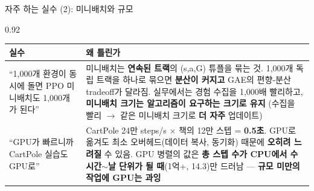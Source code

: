 \begin{frame}{자주 하는 실수 (2): 미니배치와 규모}
\begin{center}\begin{varwidth}{0.92\textwidth}
  \small
  \begin{tabular}{@{}p{4.6cm}p{9.4cm}@{}}
    \toprule
    실수 & 왜 틀린가 \\
    \midrule
    ``1,000개 환경이 동시에 돌면 PPO 미니배치도 1,000개가
      된다'' & 미니배치는 \textbf{연속된 트랙}의 (s,a,G) 튜플을
      묶는 것. 1,000개 독립 트랙을 하나로 묶으면 \textbf{분산이
      커지고} GAE의 편향-분산 tradeoff가 달라짐. 실무에서는
      경험 수집을 1,000배 빨리하고, \textbf{미니배치 크기는
      알고리즘이 요구하는 크기로 유지} (수집을 빨리 $\to$
      같은 미니배치 크기로 \textbf{더 자주} 업데이트) \\
    ``GPU가 빠르니까 CartPole 실습도 GPU로'' & CartPole 24만
      steps/s $\times$ 책의 12만 스텝 = \textbf{0.5초}. GPU로
      옮겨도 최소 오버헤드(데이터 복사, 동기화) 때문에 \textbf{오히려
      느려질} 수 있음. GPU 병렬의 값은 \textbf{총 스텝 수가 CPU에서
      수 시간$\sim$날 단위가 될 때}(1억+, 14.3)만 드러남 ---
      \textbf{규모 미만의 작업에 GPU는 과잉} \\
    \bottomrule
  \end{tabular}
\end{varwidth}\end{center}
\end{frame}
